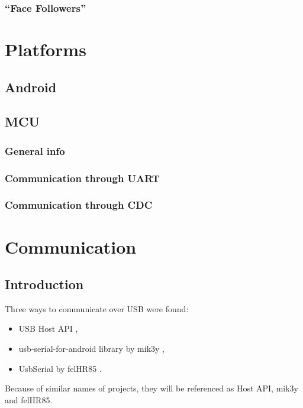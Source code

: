 \documentclass[]{mgr} %
\begin{document}
\subsection{``Face Followers''}


\chapter{Platforms}

\section{Android}

\section{MCU}
\subsection{General info}


\subsection{Communication through UART}
\subsection{Communication through CDC}

\chapter{Communication}

\section{Introduction}
Three ways to communicate over USB were found:
\begin{itemize}
  \item USB Host API \cite{android_reference},
  \item usb-serial-for-android library by mik3y \cite{mik3y},
  \item UsbSerial by felHR85 \cite{felHR85}.
\end{itemize}
Because of similar names of projects, they will be referenced as Host API, mik3y
and felHR85.
\end{document}

